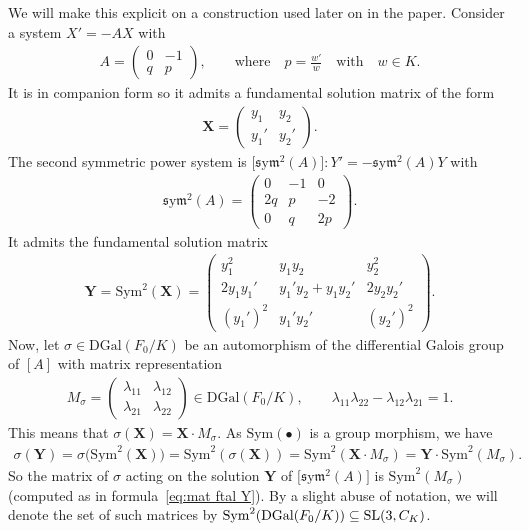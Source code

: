 \documentclass[pdftex]{sigma}%
\numberwithin{equation}{section}
\def\Sym{\mathrm{Sym}}
\def\sym{\mathfrak{s}\mathrm{y}\mathfrak{m}}
\begin{document}
\begin{Example}\label{ex-second-sym}
We will make this explicit on a construction used later on in the paper.
Consider a system $X'=-A X$ with
\begin{gather*}
A =\begin{pmatrix}0&-1 \\q&p\end{pmatrix}\!,\qquad \textrm{where} \quad p=\frac{w'}{w}
	\quad\textrm{with}\quad w\in K.
\end{gather*}
It is in companion form so it admits a fundamental solution matrix of the form
	\begin{gather*}%
	 \mathbf{X}= \begin{pmatrix} y_1 & y_2 \\ y_1' & y_2' \end{pmatrix}\!.
	\end{gather*}
The second symmetric power system is $\big[ \sym^2 (A)\big]\colon Y'=-\sym^2 (A) Y$ with
\begin{gather*}
\sym^2 (A) = \begin{pmatrix} 0&-1&0\\2q &p
	&-2\\0&q& 2p
	\end{pmatrix}\!.
\end{gather*}
It admits the fundamental solution matrix
\begin{gather}\label{eq:mat ftal Y}
 \mathbf{Y}= \Sym^2 ( \mathbf{X}) = \begin{pmatrix} y_1^2 & y_1 y_2 & y_2^2 \\[3pt] 2y_1 y_1' & y_1' y_2 + y_1 y_2' & 2y_2y_2' \\[3pt] (y_1')^2 & y_1' y_2' & (y_2')^2 \end{pmatrix}\!.
\end{gather}
Now, let $\sigma \in \mathrm{DGal}(F_0/K)$ be an automorphism of the differential Galois group of $[A]$ with matrix representation
\begin{gather*}
M_{\sigma} = \begin{pmatrix} \lambda_{11} & \lambda_{12} \\ \lambda_{21} & \lambda_{22} \end{pmatrix} \in \mathrm{DGal}(F_0/K) , \qquad \lambda_{11} \lambda_{22} - \lambda_{12} \lambda_{21} = 1.
\end{gather*}
This means that $\sigma( \mathbf{X}) = \mathbf{X}\cdot M_{\sigma}$.
As $\Sym(\bullet)$ is a group morphism, we have
\begin{gather*}
\sigma( \mathbf{Y} ) = \sigma\big(\Sym^2( \mathbf{X})\big)
	= \Sym^2( \sigma( \mathbf{X}))
	= \Sym^2( \mathbf{X}\cdot M_{\sigma} )
	= \mathbf{Y}\cdot \Sym^2( M_{\sigma} ).
\end{gather*}
So the matrix of $\sigma$ acting on the solution $ \mathbf{Y}$ of $\big[\sym^2(A)\big]$ is
$\Sym^2( M_{\sigma})$ (computed as in formula~\eqref{eq:mat ftal Y}).
By a slight abuse of notation, we will denote the set of such matrices by $\Sym^2 (\mathrm{DGal}(F_0/K)) \subseteq {\rm SL}(3, C_K)$.
\end{Example}
\end{document}
